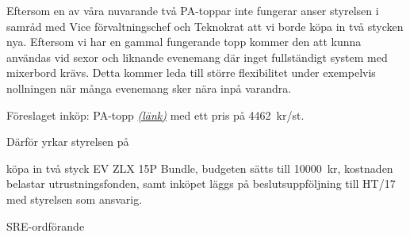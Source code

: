 \documentclass[../_main/handlingar.tex]{subfiles}
\begin{document}

Eftersom en av våra nuvarande två PA-toppar inte fungerar anser styrelsen i samråd med Vice förvaltningschef och Teknokrat att vi borde köpa in två stycken nya. Eftersom vi har en gammal fungerande topp kommer den att kunna användas vid sexor och liknande evenemang där inget fullständigt system med mixerbord krävs. Detta kommer leda till större flexibilitet under exempelvis nollningen när många evenemang sker nära inpå varandra.

Föreslaget inköp: PA-topp \href{https://www.thomann.de/se/ev_zlx_15p_bundle_2.htm?ref=search_rslt_EV+ZLX+15P_340452_2}{\textit{(länk)}} med ett pris på \SI{4462}{kr/st}.

Därför yrkar styrelsen på

\begin{attsatser}
    \att köpa in två styck EV ZLX 15P Bundle,
    \att budgeten sätts till \SI{10000}{kr},
    \att kostnaden belastar utrustningsfonden, samt
    \att inköpet läggs på beslutsuppföljning till HT/17 med styrelsen som ansvarig.
\end{attsatser}

\begin{signatures}{1}
    \ist
    \signature{\sreordf}{SRE-ordförande}
\end{signatures}
\end{document}
